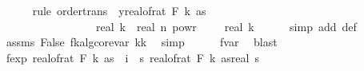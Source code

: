 \begin{isabellebody}
\ \ \ \ \isamarkupfalse%
\ {\isacharparenleft}{\kern0pt}rule\ order{\isacharunderscore}{\kern0pt}trans\ {\isacharbrackleft}{\kern0pt}\ y{\isacharequal}{\kern0pt}{\isachardoublequoteopen}{\isacharparenleft}{\kern0pt}real{\isacharunderscore}{\kern0pt}of{\isacharunderscore}{\kern0pt}rat\ {\isacharparenleft}{\kern0pt}F\ k\ as{\isacharparenright}{\kern0pt}{\isacharparenright}{\kern0pt}\ {\isacharasterisk}{\kern0pt}\isanewline
\ \ \ \ \ \ \ \ \ \ \ \ \ \ \ \ \ real\ k\ {\isacharasterisk}{\kern0pt}\ real\ n\ powr\ {\isacharparenleft}{\kern0pt}{}\ {\isacharminus}{\kern0pt}\ {}\ {\isacharslash}{\kern0pt}\ real\ k{\isacharparenright}{\kern0pt}{\isachardoublequoteclose}{\isacharbrackright}{\kern0pt}{\isacharparenright}{\kern0pt}\isanewline
\ \ \ \ \isamarkupfalse%
\ {\isacharparenleft}{\kern0pt}simp\ add{\isacharcolon}{\kern0pt}\ {\isasymOmega}{\isacharunderscore}{\kern0pt}def{\isacharparenright}{\kern0pt}\isanewline
\ \ \ \ \isamarkupfalse%
\ assms\ False\ fk{\isacharunderscore}{\kern0pt}alg{\isacharunderscore}{\kern0pt}core{\isacharunderscore}{\kern0pt}var{\isacharbrackleft}{\kern0pt}\ k{\isacharequal}{\kern0pt}{\isachardoublequoteopen}k{\isachardoublequoteclose}{\isacharbrackright}{\kern0pt}\ \isamarkupfalse%
\ simp\isanewline
\ \ \ \ \isamarkupfalse%
\ f{}{\isacharunderscore}{\kern0pt}var{\isacharunderscore}{\kern0pt}{}\ \isamarkupfalse%
\ blast\isanewline
\isanewline
\ \ \isamarkupfalse%
\ f{}{\isacharunderscore}{\kern0pt}exp{\isacharunderscore}{\kern0pt}{}{\isacharcolon}{\kern0pt}\ {\isachardoublequoteopen}{\isacharparenleft}{\kern0pt}real{\isacharunderscore}{\kern0pt}of{\isacharunderscore}{\kern0pt}rat\ {\isacharparenleft}{\kern0pt}F\ k\ as{\isacharparenright}{\kern0pt}{\isacharparenright}{\kern0pt}\ {\isacharequal}{\kern0pt}\ {\isacharparenleft}{\kern0pt}{\isasymSum}i\ {\isasymin}\ {\isacharbraceleft}{\kern0pt}{}{\isachardot}{\kern0pt}{\isachardot}{\kern0pt}{\isacharless}{\kern0pt}s\ {\isacharparenleft}{\kern0pt}real{\isacharunderscore}{\kern0pt}of{\isacharunderscore}{\kern0pt}rat\ {\isacharparenleft}{\kern0pt}F\ k\ as{\isacharparenright}{\kern0pt}{\isacharparenright}{\kern0pt}{\isacharslash}{\kern0pt}real\ s\isanewline
\ \ \ \ \isamarkupfalse%

\end{isabellebody}
